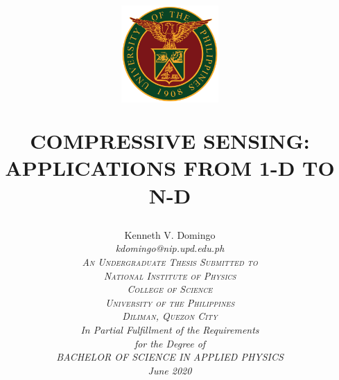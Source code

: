 \documentclass[12pt,oneside]{report}
\begin{document}

\title{
	\begin{figure}
		\centering
		\includegraphics[width=0.33\textwidth]{updlogo.png}
	\end{figure}
	\Large\uppercase{
		Compressive sensing: Applications from 1-D to N-D
	}
}

\author{
	\large\rm\expandafter{
		Kenneth V. Domingo 
	}\\
	\large\itshape\expandafter{
		kdomingo@nip.upd.edu.ph
	}\\
	\vskip0.5in
	\textsc{An Undergraduate Thesis Submitted to}\\
	\textsc{National Institute of Physics}\\
	\textsc{College of Science}\\
	\textsc{University of the Philippines} \\
	\textsc{Diliman, Quezon City}\\
	\vskip0.25in
	\rm In Partial Fulfillment of the Requirements\\
	\rm for the Degree of\\
	\rm\uppercase\expandafter{Bachelor of Science}
	\rm\uppercase{in}
	\rm\uppercase\expandafter{Applied Physics}\\
	\rm\expandafter{June 2020}
}

\maketitle
\thispagestyle{titlestyle}

%

\doublespacing
%

\tableofcontents
\listoftables
\listoffigures

\cleardoublepage
{}


\cleardoublepage
{}












\appendix

\end{document}
